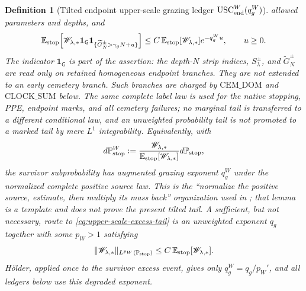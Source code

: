 \documentclass[11pt]{article}
\newtheorem{definition}[theorem]{Definition}
\newcommand{\one}{\mathbf 1}
\begin{document}
\begin{definition}[Tilted endpoint upper-scale grazing ledger
$\mathrm{USC}_{\rm end}^{W}(q_g^W)$]
allowed parameters and depths, and
\begin{equation}
\label{eq:upper-scale-excess-tail}
 \mathbb E_{\rm stop}\!\left[
  \mathscr W_{\lambda,*}\one_{\mathsf G}
  \one_{\{\widetilde G_N^\pm>\gamma_gN+u\}}\right]
 \le C\,\mathbb E_{\rm stop}[\mathscr W_{\lambda,*}]
 e^{-q_g^Wu},\qquad u\ge0.
\end{equation}
The indicator $\one_{\mathsf G}$ is part of the assertion: the depth-$N$
strip indices, $S_\lambda^\pm$, and $\widetilde G_N^\pm$ are read only on
retained homogeneous endpoint branches.  They are not extended to an early
cemetery branch.  Such branches are charged by $\mathrm{CEM\_DOM}$ and
$\mathrm{CLOCK\_SUM}$ below.  The same complete label law is used for the
native stopping, PPE, endpoint marks, and all cemetery failures;
no marginal tail is transferred to a different conditional law, and an
unweighted probability tail is not promoted to a marked tail by mere
$L^1$ integrability.  Equivalently, with
\[
 d\mathbb P_{\rm stop}^{W}
 :=\frac{\mathscr W_{\lambda,*}}
 {\mathbb E_{\rm stop}[\mathscr W_{\lambda,*}]}
 d\mathbb P_{\rm stop},
\]
the survivor subprobability has augmented grazing exponent $q_g^W$ under the
normalized complete positive source law.  This is the ``normalize the
positive source, estimate,
then multiply its mass back'' organization used in
\cite[Lemma~5.10]{CanestrariHoles}; that lemma is a template and does not
prove the present tilted tail.  A sufficient, but not necessary, route to
\eqref{eq:upper-scale-excess-tail} is an unweighted exponent $q_g$ together
with some $p_W>1$ satisfying
\begin{equation}
\label{eq:USC-holder-sufficient-condition}
 \|\mathscr W_{\lambda,*}\|_{L^{p_W}(\mathbb P_{\rm stop})}
 \le C\,\mathbb E_{\rm stop}[\mathscr W_{\lambda,*}].
\end{equation}
H\"older, applied once to the survivor excess event, gives only
$q_g^W=q_g/p_W'$, and all ledgers below use this degraded exponent.
\end{definition}
\end{document}
